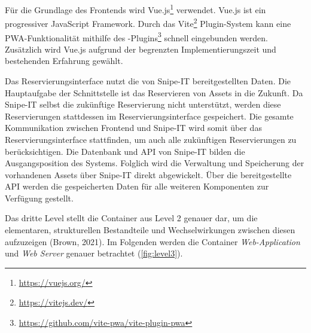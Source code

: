 Für die Grundlage des Frontends wird Vue.js\footnote{\url{https://vuejs.org/}} verwendet. Vue.js ist
ein progressiver JavaScript Framework. Durch das Vite\footnote{\url{https://vitejs.dev/}}
Plugin-System kann eine PWA-Funktionalität mithilfe des
-Plugins\footnote{\url{https://github.com/vite-pwa/vite-plugin-pwa}}
schnell eingebunden werden. Zusätzlich wird Vue.js aufgrund der begrenzten Implementierungszeit und
bestehenden Erfahrung gewählt.

Das Reservierungsinterface nutzt die von Snipe-IT bereitgestellten Daten. Die
Hauptaufgabe der Schnittstelle ist das Reservieren von Assets in die Zukunft. Da
Snipe-IT selbst die zukünftige Reservierung nicht unterstützt, werden diese
Reservierungen stattdessen im Reservierungsinterface gespeichert. Die gesamte
Kommunikation zwischen Frontend und Snipe-IT wird somit über das
Reservierungsinterface stattfinden, um auch alle zukünftigen Reservierungen zu
berücksichtigen. Die Datenbank und API von Snipe-IT bilden die Ausgangsposition
des Systems. Folglich wird die Verwaltung und Speicherung der vorhandenen Assets
über Snipe-IT direkt abgewickelt. Über die bereitgestellte API werden die
gespeicherten Daten für alle weiteren Komponenten zur Verfügung gestellt.

    {\sffamily\color{maincolor}{Level 3: Components}}

Das dritte Level stellt die Container aus Level 2 genauer dar, um die
elementaren, strukturellen Bestandteile und Wechselwirkungen zwischen diesen
aufzuzeigen (Brown, 2021). Im Folgenden werden die Container
\textit{Web-Application} und \textit{Web Server} genauer betrachtet
(\ref{fig:level3}).

